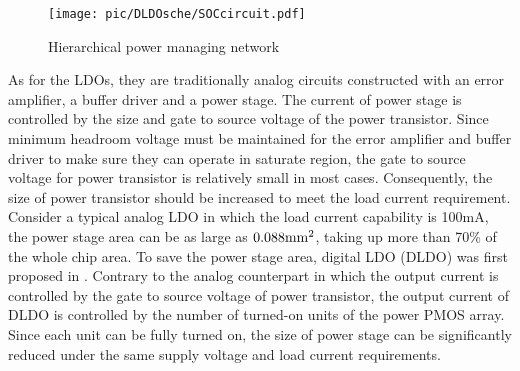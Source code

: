 \documentclass[journal]{IEEEtran}
\begin{document}
\begin{figure}[t!]
    \centering
    \texttt{[image: pic/DLDOsche/SOCcircuit.pdf]}
    \caption{Hierarchical power managing network}
    \label{fig:hierarchical}
\end{figure}
As for the LDOs, they are traditionally analog circuits constructed with an error amplifier, a buffer driver and a power stage\cite{ALDO1,ALDO2,ALDO3,ALDO4,ALDO5}. The current of power stage is controlled by the size and gate to source voltage of the power transistor. Since minimum headroom voltage must be maintained for the error amplifier and buffer driver to make sure they can operate in saturate region, the gate to source voltage for power transistor is relatively small in most cases. Consequently, the size of power transistor should be increased to meet the load current requirement. Consider a typical analog LDO in which the load current capability is 100mA, the power stage area can be as large as $\rm 0.088 mm^2$, taking up more than 70\% of the whole chip area\cite{ALDO5}. To save the power stage area, digital LDO (DLDO) was first proposed in \cite{original}. Contrary to the analog counterpart in which the output current is controlled by the gate to source voltage of power transistor, the output current of DLDO is controlled by the number of turned-on units of the power PMOS array. Since each unit can be fully turned on, the size of power stage can be significantly reduced under the same supply voltage and load current requirements\cite{AP}.
\end{document}
